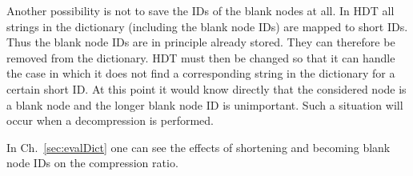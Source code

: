Another possibility is not to save the IDs of the blank nodes at all. In HDT all strings in the dictionary (including the blank node IDs) are mapped to short IDs. Thus the blank node IDs are in principle already stored. They can therefore be removed from the dictionary. HDT must then be changed so that it can handle the case in which it does not find a corresponding string in the dictionary for a certain short ID. At this point it would know directly that the considered node is a blank node and the longer blank node ID is unimportant. Such a situation will occur when a decompression is performed.

In Ch.~\ref{sec:evalDict} one can see the effects of shortening and becoming blank node IDs on the compression ratio.















